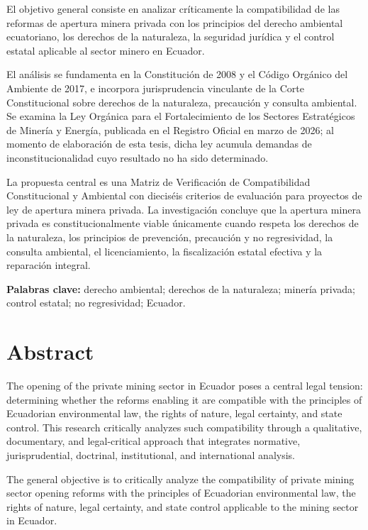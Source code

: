 El objetivo general consiste en analizar críticamente la compatibilidad de las reformas de apertura minera privada con los principios del derecho ambiental ecuatoriano, los derechos de la naturaleza, la seguridad jurídica y el control estatal aplicable al sector minero en Ecuador.

El análisis se fundamenta en la Constitución de 2008 y el Código Orgánico del Ambiente de 2017, e incorpora jurisprudencia vinculante de la Corte Constitucional sobre derechos de la naturaleza, precaución y consulta ambiental. Se examina la Ley Orgánica para el Fortalecimiento de los Sectores Estratégicos de Minería y Energía, publicada en el Registro Oficial en marzo de 2026; al momento de elaboración de esta tesis, dicha ley acumula demandas de inconstitucionalidad cuyo resultado no ha sido determinado.

La propuesta central es una Matriz de Verificación de Compatibilidad Constitucional y Ambiental con dieciséis criterios de evaluación para proyectos de ley de apertura minera privada. La investigación concluye que la apertura minera privada es constitucionalmente viable únicamente cuando respeta los derechos de la naturaleza, los principios de prevención, precaución y no regresividad, la consulta ambiental, el licenciamiento, la fiscalización estatal efectiva y la reparación integral.

\textbf{Palabras clave:} derecho ambiental; derechos de la naturaleza; minería privada; control estatal; no regresividad; Ecuador.

\chapter*{Abstract}

The opening of the private mining sector in Ecuador poses a central legal tension: determining whether the reforms enabling it are compatible with the principles of Ecuadorian environmental law, the rights of nature, legal certainty, and state control. This research critically analyzes such compatibility through a qualitative, documentary, and legal-critical approach that integrates normative, jurisprudential, doctrinal, institutional, and international analysis.

The general objective is to critically analyze the compatibility of private mining sector opening reforms with the principles of Ecuadorian environmental law, the rights of nature, legal certainty, and state control applicable to the mining sector in Ecuador.

